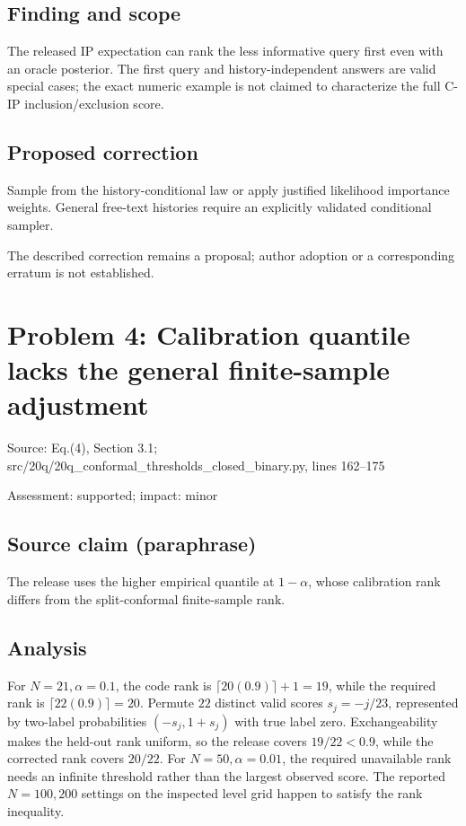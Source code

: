 \documentclass[11pt]{article}
\begin{document}
\subsection*{Finding and scope}

The released IP expectation can rank the less informative query first even with an oracle posterior. The first query and history-independent answers are valid special cases; the exact numeric example is not claimed to characterize the full C-IP inclusion/exclusion score.

\subsection*{Proposed correction}

Sample from the history-conditional law or apply justified likelihood importance weights. General free-text histories require an explicitly validated conditional sampler.

The described correction remains a proposal; author adoption or a corresponding erratum is not established.

\section*{Problem 4: Calibration quantile lacks the general finite-sample adjustment}

Source: Eq.(4), Section 3.1; src/20q/20q\_conformal\_thresholds\_closed\_binary.py, lines 162–175

Assessment: supported; impact: minor

\subsection*{Source claim (paraphrase)}

The release uses the higher empirical quantile at \(1-\alpha\), whose calibration rank differs from the split-conformal finite-sample rank.

\subsection*{Analysis}

For \(N=21,\alpha=0.1\), the code rank is \(\lceil20(0.9)\rceil+1=19\), while the required rank is \(\lceil22(0.9)\rceil=20\). Permute \(22\) distinct valid scores \(s_j=-j/23\), represented by two-label probabilities \((-s_j,1+s_j)\) with true label zero. Exchangeability makes the held-out rank uniform, so the release covers \(19/22<0.9\), while the corrected rank covers \(20/22\). For \(N=50,\alpha=0.01\), the required unavailable rank needs an infinite threshold rather than the largest observed score. The reported \(N=100,200\) settings on the inspected level grid happen to satisfy the rank inequality.
\end{document}
